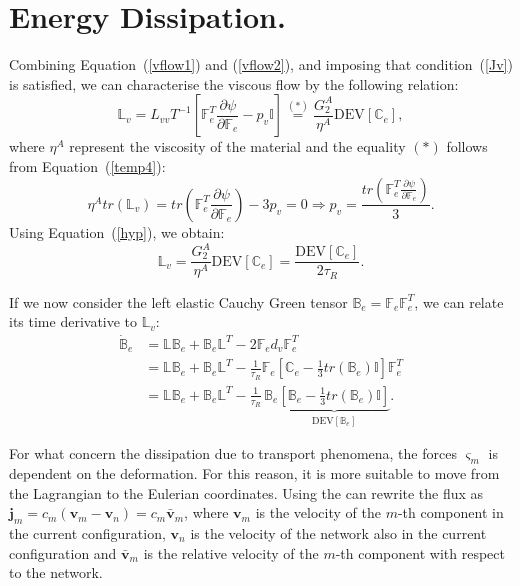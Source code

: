 \documentclass[runningheads]{llncs}
\newcommand{\F}{\ensuremath{\mathbb{F}}}
\newcommand{\LL}{\ensuremath{\mathbb{L}}}
\begin{document}
\section{Energy Dissipation.}
\label{apenergy}
Combining Equation~(\ref{vflow1}) and (\ref{vflow2}), and imposing that condition~(\ref{Jv}) is satisfied, we can characterise the viscous flow by the following relation:
\begin{equation}
\LL_v = L_{vv}T^{-1}\left[\F_e^T\frac{\partial \psi}{\partial \F_e}-p_v\mathbb{I}\right] \stackrel{(\ast)}{=} \frac{G^A_2}{\eta^A}\text{DEV}\left[\mathbb{C}_e\right] ,\label{Lv1}
\end{equation}
where $\eta^A$ represent the viscosity of the material and the equality $(\ast)$ follows from Equation~(\ref{temp4}):
\begin{equation}
\eta^A tr(\LL_v)= tr\left(\F_e^T\frac{\partial \psi}{\partial \F_e}\right) -  3 p_v=0 \Longrightarrow  p_v = \frac{tr\left(\F_e^T\frac{\partial \psi}{\partial \F_e}\right)}{3}.
\end{equation}
Using Equation~(\ref{hyp}), we obtain:
\begin{equation}
\LL_v = \frac{G^A_2 }{\eta^A}\text{DEV}[\mathbb{C}_e] = \frac{\text{DEV}[\mathbb{C}_e]}{2\tau_R}.\label{apBe}
\end{equation}

If we now consider the left elastic Cauchy Green tensor $\mathbb{B}_e=\F_e \F^T_e$, we can relate its time derivative to $\LL_v$:
\begin{equation}
\begin{aligned}
\dot{\mathbb{B}}_e &= \LL \mathbb{B}_e + \mathbb{B}_e \LL^T - 2 \F_e d_v \F_e^{T} \\
&= \LL\mathbb{B}_e + \mathbb{B}_e \LL^T - \frac{1}{\tau_R} \F_e\left[\mathbb{C}_e-\frac{1}{3}tr(\mathbb{B}_e)\mathbb{I}\right]\F_e^T\\
&= \LL\mathbb{B}_e + \mathbb{B}_e \LL^T - \frac{1}{\tau_R} \,\mathbb{B}_e\underbrace{\left[\mathbb{B}_e-\frac{1}{3}tr(\mathbb{B}_e)\mathbb{I}\right]}_{\text{DEV}[\mathbb{B}_e]}.
\end{aligned}
\end{equation}

For what concern the dissipation due to transport phenomena, the forces $\varsigma_m$ is dependent on the deformation. For this reason, it is more suitable to move from the Lagrangian to the Eulerian coordinates.  Using the  can rewrite the flux as $\mathbf{j}_m = c_m (\mathbf{v}_m-\mathbf{v}_n)= c_m \bar{\mathbf{v}}_{m}$, where $\mathbf{v}_m$ is the velocity of the $m$-th component in the current configuration, $\mathbf{v}_n$ is the velocity of the network also in the current configuration and  $\bar{\mathbf{v}}_{m}$ is the relative velocity of the $m$-th component with respect to the network. 
\end{document}
